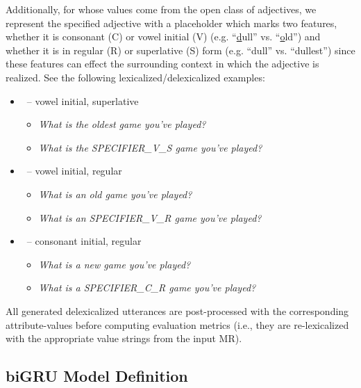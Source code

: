\label{app:specifier} Additionally, for  whose values come from the open class of
adjectives, we represent the specified adjective with a placeholder which
marks two features, whether it is consonant (C) or vowel initial (V) (e.g.
``\ul{d}ull'' vs. ``\ul{o}ld'') and whether it is in regular (R) or
superlative (S) form (e.g. ``dull'' vs. ``dullest'') since these features can
effect the surrounding context in which the adjective is realized.  See the
following lexicalized/delexicalized examples:
\begin{itemize}
        \item {}~-- vowel initial, superlative
\begin{itemize}
    \item \textit{What is the oldest game you've played?}
    \item \textit{What is the SPECIFIER\_V\_S game you've played?}
\end{itemize}
        \item {}~-- vowel initial, regular

\begin{itemize}
    \item \textit{What is an old game you've played?}
    \item \textit{What is an SPECIFIER\_V\_R game you've played?}
\end{itemize}

        \item {}~-- consonant initial, regular

\begin{itemize}
    \item \textit{What is a new game you've played?}
    \item \textit{What is a SPECIFIER\_C\_R game you've played?}
\end{itemize}
\end{itemize}

All generated delexicalized utterances are post-processed with the
corresponding attribute-values before computing evaluation metrics (i.e., 
they are re-lexicalized with the appropriate value strings from the input MR).





\subsection{biGRU Model Definition}

